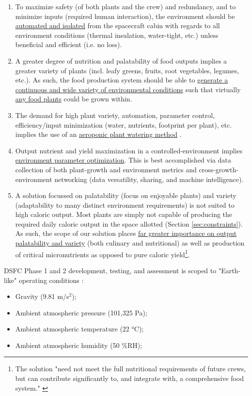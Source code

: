 \documentclass{../tex/report}
\begin{document}
\begin{enumerate}[label=SC\arabic*., ref=SC\arabic*]
\begin{enumerate}[label=SC3\alph*., ref=SC3\alph*]
        \end{enumerate}
    \item \label{sc:4} To maximize safety (of both plants and the crew) and redundancy, and to minimize inputs (required human interaction), the environment should be \uline{automated and isolated} from the spacecraft cabin with regards to all environment conditions (thermal insulation, water-tight, etc.) unless beneficial and efficient (i.e. no loss).
\clearpage
    \item \label{sc:5} A greater degree of nutrition and palatability of food outputs implies a greater variety of plants (incl. leafy greens, fruits, root vegetables, legumes, etc.). As such, the food production system should be able to \uline{generate a continuous and wide variety of environmental conditions} such that virtually \uline{any food plants} could be grown within.
    \item \label{sc:6} The demand for high plant variety, automation, parameter control, efficiency/input minimization (water, nutrients, footprint per plant), etc. implies the use of an \uline{aeroponic plant watering method} \cite{spinoff}.
    \item \label{sc:7} Output nutrient and yield maximization in a controlled-environment implies \uline{environment parameter optimization}. This is best accomplished via data collection of both plant-growth and environment metrics and cross-growth-environment networking (data versatility, sharing, and machine intelligence).
    \item \label{sc:8} A solution focussed on palatability (focus on enjoyable plants) and variety (adaptability to many distinct environment requirements) is not suited to high caloric output. Most plants are simply not capable of producing the required daily caloric output in the space allotted (Section \ref{sec:constraints}). As such, the scope of our solution places \uline{far greater importance on output palatability and variety} (both culinary and nutritional) as well as production of critical micronutrients as opposed to pure caloric yield\footnote{The solution "need not meet the full nutritional requirements of future crews, but can contribute significantly to, and integrate with, a comprehensive food system." \cite{applicantguide}}.
\end{enumerate}

DSFC Phase 1 and 2 development, testing, and assessment is scoped to "Earth-like" operating conditions \cite{applicantguide,dsfc-phase2}:
\begin{itemize}
    \item Gravity (9.81 m/s${}^2$);
    \item Ambient atmospheric pressure (101,325 Pa);
    \item Ambient atmospheric temperature (22 °C);
    \item Ambient atmospheric humidity (50 \%RH);
\end{itemize}
\end{document}

